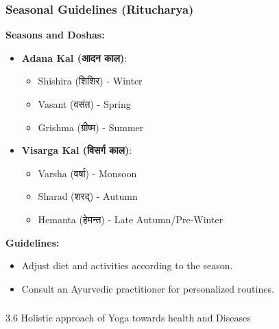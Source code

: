 \begin{frame}[fragile]\frametitle{Seasonal Guidelines (Ritucharya)}
    \textbf{Seasons and Doshas:}
    \begin{itemize}
        \item \textbf{Adana Kal (आदन काल)}: 
        \begin{itemize}
            \item Shishira (शिशिर) - Winter
            \item Vasant (वसंत) - Spring
            \item Grishma (ग्रीष्म) - Summer
        \end{itemize}
        \item \textbf{Visarga Kal (विसर्ग काल)}:
        \begin{itemize}
            \item Varsha (वर्षा) - Monsoon
            \item Sharad (शरद्) - Autumn
            \item Hemanta (हेमन्त) - Late Autumn/Pre-Winter
        \end{itemize}
    \end{itemize}

    \textbf{Guidelines:}
    \begin{itemize}
        \item Adjust diet and activities according to the season.
        \item Consult an Ayurvedic practitioner for personalized routines.
    \end{itemize}
\end{frame}

\begin{frame}[fragile]\frametitle{}
\begin{center}
{\Large 3.6 Holistic approach of Yoga towards health and Diseases}
\end{center}
\end{frame}


        
